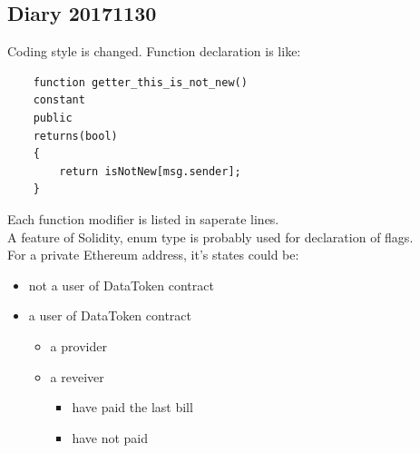\subsection{Diary 20171130}
Coding style is changed. Function declaration is like:
\begin{lstlisting}
    function getter_this_is_not_new() 
    constant 
    public
    returns(bool) 
    {
        return isNotNew[msg.sender];
    }
\end{lstlisting}
Each function modifier is listed in saperate lines.\\
A feature of Solidity, enum type is probably used for declaration of flags.\\
For a private Ethereum address, it's states could be:
\begin{itemize}
    \item not a user of DataToken contract
    \item a user of DataToken contract
    \begin{itemize}
        \item a provider 
        \item a reveiver
        \begin{itemize}
            \item have paid the last bill
            \item have not paid
        \end{itemize}
    \end{itemize}
\end{itemize}
